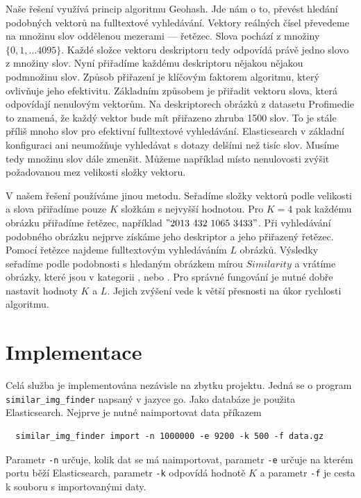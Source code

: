 Naše řešení využívá princip algoritmu Geohash. Jde nám o to, převést hledání podobných vektorů na fulltextové vyhledávání. Vektory reálných čísel převedeme na množinu slov oddělenou mezerami --- řetězec. Slova pochází z množiny $\{0, 1,… 4095\}$. Každé složce vektoru deskriptoru tedy odpovídá právě jedno slovo z množiny slov. Nyní přiřadíme každému deskriptoru nějakou nějakou podmnožinu slov. Způsob přiřazení je klíčovým faktorem algoritmu, který ovlivňuje jeho efektivitu. Základním způsobem je přiřadit vektoru slova, která odpovídají nenulovým vektorům. Na deskriptorech obrázků z datasetu Profimedie to znamená, že každý vektor bude mít přiřazeno zhruba 1500 slov. To je stále příliš mnoho slov pro efektivní fulltextové vyhledávání. Elasticsearch v základní konfiguraci ani neumožňuje vyhledávat s dotazy delšími než tisíc slov. Musíme tedy množinu slov dále zmenšit. Můžeme například místo nenulovosti zvýšit požadovanou mez velikosti složky vektoru.

V našem řešení používáme jinou metodu. Seřadíme složky vektorů podle velikosti a slova přiřadíme pouze $K$ složkám s nejvyšší hodnotou. Pro $K = 4$ pak každému obrázku přiřadíme řetězec, například $\mathrm{"}2013\ 432\ 1065\ 3433\mathrm{"}$. Při vyhledávání podobného obrázku nejprve získáme jeho deskriptor a jeho přiřazený řetězec. Pomocí řetězce najdeme fulltextovým vyhledáváním $L$ obrázků. Výsledky seřadíme podle podobnosti s hledaným obrázkem mírou $Similarity$ a vrátíme obrázky, které jsou v kategorii , nebo . Pro správné fungování je nutné dobře nastavit hodnoty $K$ a $L$. Jejich zvýšení vede k větší přesnosti na úkor rychlosti algoritmu.

\section{Implementace}

Celá služba je implementována nezávisle na zbytku projektu. Jedná se o program \lstinline{similar_img_finder} napsaný v jazyce go. Jako databáze je použita Elasticsearch. Nejprve je nutné naimportovat data příkazem

\begin{lstlisting}
  similar_img_finder import -n 1000000 -e 9200 -k 500 -f data.gz
\end{lstlisting}

Parametr \lstinline{-n} určuje, kolik dat se má naimportovat, parametr \lstinline{-e} určuje na kterém portu běží Elasticsearch, parametr \lstinline{-k} odpovídá hodnotě $K$ a parametr \lstinline{-f} je cesta k souboru s importovanými daty.

